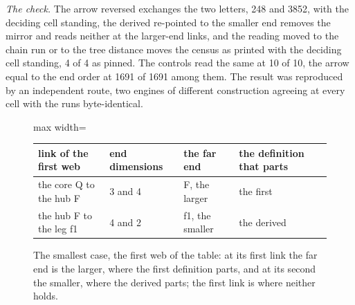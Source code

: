 \begin{chproof}
\textit{The check.} The arrow reversed exchanges the two letters, 248 and 3852, with the deciding cell standing, the derived re-pointed to the smaller end removes the mirror and reads neither at the larger-end links, and the reading moved to the chain run or to the tree distance moves the census as printed with the deciding cell standing, 4 of 4 as pinned. The controls read the same at 10 of 10, the arrow equal to the end order at 1691 of 1691 among them. The result was reproduced by an independent route, two engines of different construction agreeing at every cell with the runs byte-identical.
\end{chproof}
\begin{figure}[h]
\centering
\begin{adjustbox}{max width=\linewidth}\begin{tabular}{llll}
\hline
link of the first web & end dimensions & the far end & the definition that parts \\
\hline
the core Q to the hub F & 3 and 4 & F, the larger & the first \\
the hub F to the leg f1 & 4 and 2 & f1, the smaller & the derived \\
\hline
\end{tabular}\end{adjustbox}
\caption{The smallest case, the first web of the table: at its first link the far end is the larger, where the first definition parts, and at its second the smaller, where the derived parts; the first link is where neither holds.}
\end{figure}
